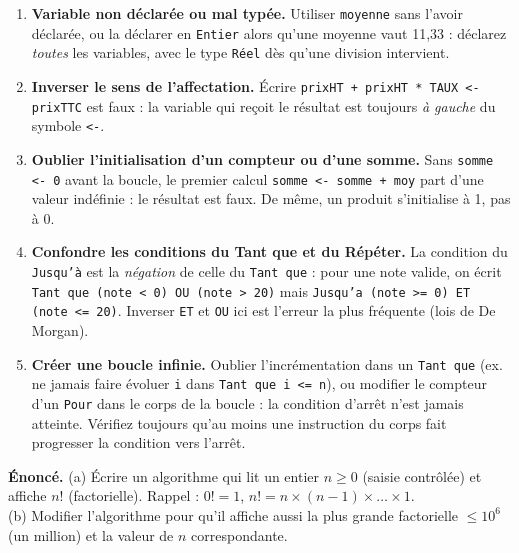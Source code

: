 \documentclass[11pt]{article}
\begin{document}
\begin{attention}
\begin{enumerate}
\item \textbf{Variable non déclarée ou mal typée.} Utiliser \texttt{moyenne} sans l'avoir déclarée, ou la déclarer en \texttt{Entier} alors qu'une moyenne vaut 11,33 : déclarez \emph{toutes} les variables, avec le type \texttt{Réel} dès qu'une division intervient.
\item \textbf{Inverser le sens de l'affectation.} Écrire \texttt{prixHT + prixHT * TAUX <- prixTTC} est faux : la variable qui reçoit le résultat est toujours \emph{à gauche} du symbole \texttt{<-}.
\item \textbf{Oublier l'initialisation d'un compteur ou d'une somme.} Sans \texttt{somme <- 0} avant la boucle, le premier calcul \texttt{somme <- somme + moy} part d'une valeur indéfinie : le résultat est faux. De même, un produit s'initialise à 1, pas à 0.
\item \textbf{Confondre les conditions du Tant que et du Répéter.} La condition du \texttt{Jusqu'à} est la \emph{négation} de celle du \texttt{Tant que} : pour une note valide, on écrit \texttt{Tant que (note < 0) OU (note > 20)} mais \texttt{Jusqu'a (note >= 0) ET (note <= 20)}. Inverser \texttt{ET} et \texttt{OU} ici est l'erreur la plus fréquente (lois de De Morgan).
\item \textbf{Créer une boucle infinie.} Oublier l'incrémentation dans un \texttt{Tant que} (ex. ne jamais faire évoluer \texttt{i} dans \texttt{Tant que i <= n}), ou modifier le compteur d'un \texttt{Pour} dans le corps de la boucle : la condition d'arrêt n'est jamais atteinte. Vérifiez toujours qu'au moins une instruction du corps fait progresser la condition vers l'arrêt.
\end{enumerate}
\end{attention}

\begin{exercice}
\textbf{Énoncé.} (a) Écrire un algorithme qui lit un entier $n \geq 0$ (saisie contrôlée) et affiche $n!$ (factorielle). Rappel : $0! = 1$, $n! = n \times (n-1) \times \dots \times 1$. \\
(b) Modifier l'algorithme pour qu'il affiche aussi la plus grande factorielle $\leq 10^6$ (un million) et la valeur de $n$ correspondante.
\end{exercice}
\end{document}
